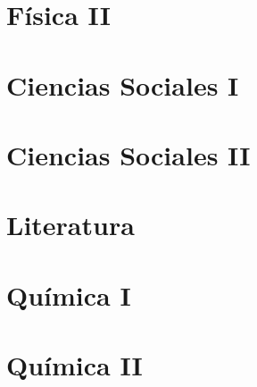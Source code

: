 \documentclass[12pt,fleqn]{book} %
\begin{document}
\chapter{F\'{i}sica II}\label{chap:phy2}




\chapter{Ciencias Sociales I}\label{chap:soc1}




\chapter{Ciencias Sociales II}\label{chap:soc2}





\chapter{Literatura}\label{chap:lit1}





\chapter{Qu\'{i}mica I}\label{chap:quim1}



\chapter{Qu\'{i}mica II}\label{chap:quim2}

\end{document}
